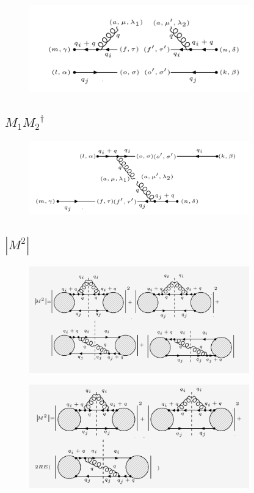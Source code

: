 \begin{figure}[h!]
\centering
\includegraphics[width=0.85\textwidth]{images/qbargqMSquer.png}
\end{figure}
\newpage

\subsection{$M_1 {M_2}^{\dagger}$}

\begin{figure}[h!]
\centering
\includegraphics[width=0.85\textwidth]{images/M1M2Degaqqg.png}
\end{figure}

\subsection{$|M^{2}|$}

\begin{figure}[h!]
\centering
\includegraphics[width=0.85\textwidth]{images/qqgMSquer.png}
\end{figure}

\begin{figure}[h!]
\centering
\includegraphics[width=0.85\textwidth]{images/REqqgMSquer.png}
\end{figure}

\newpage